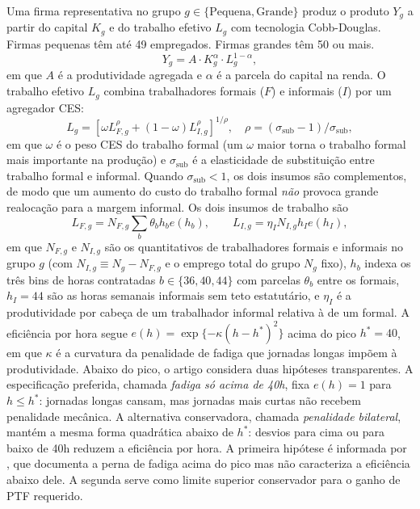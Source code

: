 \documentclass[10pt,twocolumn]{article}
\begin{document}
Uma firma representativa no grupo $g\in\{\text{Pequena},\text{Grande}\}$ produz o produto $Y_g$ a partir do capital $K_g$ e do trabalho efetivo $L_g$ com tecnologia Cobb-Douglas. Firmas pequenas t\^em at\'e 49 empregados. Firmas grandes t\^em 50 ou mais.
\begin{equation}\label{eq:production}
Y_g = A\cdot K_g^{\alpha}\cdot L_g^{1-\alpha},
\end{equation}
em que $A$ \'e a produtividade agregada e $\alpha$ \'e a parcela do capital na renda. O trabalho efetivo $L_g$ combina trabalhadores formais ($F$) e informais ($I$) por um agregador CES:
\begin{equation}\label{eq:ces}
L_g = \left[\omega L_{F,g}^{\rho} + (1-\omega)L_{I,g}^{\rho}\right]^{1/\rho},\quad \rho=(\sigma_{\text{sub}}-1)/\sigma_{\text{sub}},
\end{equation}
em que $\omega$ \'e o peso CES do trabalho formal (um $\omega$ maior torna o trabalho formal mais importante na produ\c{c}\~ao) e $\sigma_{\text{sub}}$ \'e a elasticidade de substitui\c{c}\~ao entre trabalho formal e informal. Quando $\sigma_{\text{sub}}<1$, os dois insumos s\~ao complementos, de modo que um aumento do custo do trabalho formal \emph{n\~ao} provoca grande realoca\c{c}\~ao para a margem informal. Os dois insumos de trabalho s\~ao
\[
L_{F,g}=N_{F,g}\sum_b\theta_b h_b e(h_b),\qquad L_{I,g}=\eta_I N_{I,g} h_I e(h_I),
\]
em que $N_{F,g}$ e $N_{I,g}$ s\~ao os quantitativos de trabalhadores formais e informais no grupo $g$ (com $N_{I,g}\equiv N_g-N_{F,g}$ e o emprego total do grupo $N_g$ fixo), $h_b$ indexa os tr\^es bins de horas contratadas $b\in\{36,40,44\}$ com parcelas $\theta_b$ entre os formais, $h_I=44$ s\~ao as horas semanais informais sem teto estatut\'ario, e $\eta_I$ \'e a produtividade por cabe\c{c}a de um trabalhador informal relativa \`a de um formal. A efici\^encia por hora segue $e(h)=\exp\{-\kappa(h-h^*)^2\}$ acima do pico $h^*=40$, em que $\kappa$ \'e a curvatura da penalidade de fadiga que jornadas longas imp\~oem \`a produtividade. Abaixo do pico, o artigo considera duas hip\'oteses transparentes. A especifica\c{c}\~ao preferida, chamada \emph{fadiga s\'o acima de 40h}, fixa $e(h)=1$ para $h\leq h^*$: jornadas longas cansam, mas jornadas mais curtas n\~ao recebem penalidade mec\^anica. A alternativa conservadora, chamada \emph{penalidade bilateral}, mant\'em a mesma forma quadr\'atica abaixo de $h^*$: desvios para cima ou para baixo de 40h reduzem a efici\^encia por hora. A primeira hip\'otese \'e informada por \citet{Pencavel2015}, que documenta a perna de fadiga acima do pico mas n\~ao caracteriza a efici\^encia abaixo dele. A segunda serve como limite superior conservador para o ganho de PTF requerido.
\end{document}
